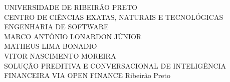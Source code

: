 \begin{titlepage}
    \begin{center}
        \fontsize{12pt}{12pt}\selectfont UNIVERSIDADE DE RIBEIRÃO PRETO\\
        \fontsize{12pt}{12pt}\selectfont CENTRO DE CIÊNCIAS EXATAS, NATURAIS E TECNOLÓGICAS\\
        \fontsize{12pt}{12pt}\selectfont ENGENHARIA DE SOFTWARE\\
        \vspace{4cm}
        \fontsize{12pt}{12pt}\selectfont MARCO ANTÔNIO LONARDON JÚNIOR\\
        \fontsize{12pt}{12pt}\selectfont MATHEUS LIMA BONADIO\\
        \fontsize{12pt}{12pt}\selectfont VITOR NASCIMENTO MOREIRA\\
        \vspace{4cm}
        \fontsize{14pt}{14pt}\selectfont SOLUÇÃO PREDITIVA E CONVERSACIONAL DE INTELIGÊNCIA FINANCEIRA VIA OPEN FINANCE
        \vfill
        \fontsize{12pt}{12pt}\selectfont Ribeirão Preto\\
        \fontsize{12pt}{12pt}
    \end{center}
\end{titlepage}
